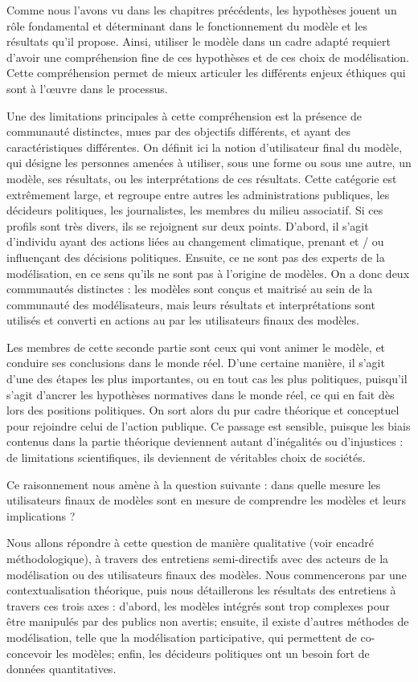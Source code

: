 \newpage


Comme nous l'avons vu dans les chapitres précédents, les hypothèses jouent un rôle fondamental et déterminant dans le fonctionnement du modèle et les résultats qu'il propose. Ainsi, utiliser le modèle dans un cadre adapté requiert d'avoir une compréhension fine de ces hypothèses et de ces choix de modélisation. Cette compréhension permet de mieux articuler les différents enjeux éthiques qui sont à l'œuvre dans le processus. 

Une des limitations principales à cette compréhension est la présence de communauté distinctes, mues par des objectifs différents, et ayant des caractéristiques différentes. On définit ici la notion d'utilisateur final du modèle, qui désigne les personnes amenées à utiliser, sous une forme ou sous une autre, un modèle, ses résultats, ou les interprétations de ces résultats. Cette catégorie est extrêmement large, et regroupe entre autres les administrations publiques, les décideurs politiques, les journalistes, les membres du milieu associatif. Si ces profils sont très divers, ils se rejoignent sur deux points. D'abord, il s'agit d'individu ayant des actions liées au changement climatique, prenant et / ou influençant des décisions politiques. Ensuite, ce ne sont pas des experts de la modélisation, en ce sens qu'ils ne sont pas à l'origine de modèles. On a donc deux communautés distinctes : les modèles sont conçus et maitrisé au sein de la communauté des modélisateurs, mais leurs résultats et interprétations sont utilisés et converti en actions au par les utilisateurs finaux des modèles. 

Les membres de cette seconde partie sont ceux qui vont animer le modèle, et conduire ses conclusions dans le monde réel. D'une certaine manière, il s'agit d'une des étapes les plus importantes, ou en tout cas les plus politiques, puisqu'il s'agit d'ancrer les hypothèses normatives dans le monde réel, ce qui en fait dès lors des positions politiques. On sort alors du pur cadre théorique et conceptuel pour rejoindre celui de l'action publique. Ce passage est sensible, puisque les biais contenus dans la partie théorique deviennent autant d'inégalités ou d'injustices : de limitations scientifiques, ils deviennent de véritables choix de sociétés.

Ce raisonnement nous amène à la question suivante : dans quelle mesure les utilisateurs finaux de modèles sont en mesure de comprendre les modèles et leurs implications ? 

Nous allons répondre à cette question de manière qualitative (voir encadré méthodologique), à travers des entretiens semi-directifs avec des acteurs de la modélisation ou des utilisateurs finaux des modèles. Nous commencerons par une contextualisation théorique, puis nous détaillerons les résultats des entretiens à travers ces trois axes : d'abord, les modèles intégrés sont trop complexes pour être manipulés par des publics non avertis; ensuite, il existe d'autres méthodes de modélisation, telle que la modélisation participative, qui permettent de co-concevoir les modèles; enfin, les décideurs politiques ont un besoin fort de données quantitatives. 




